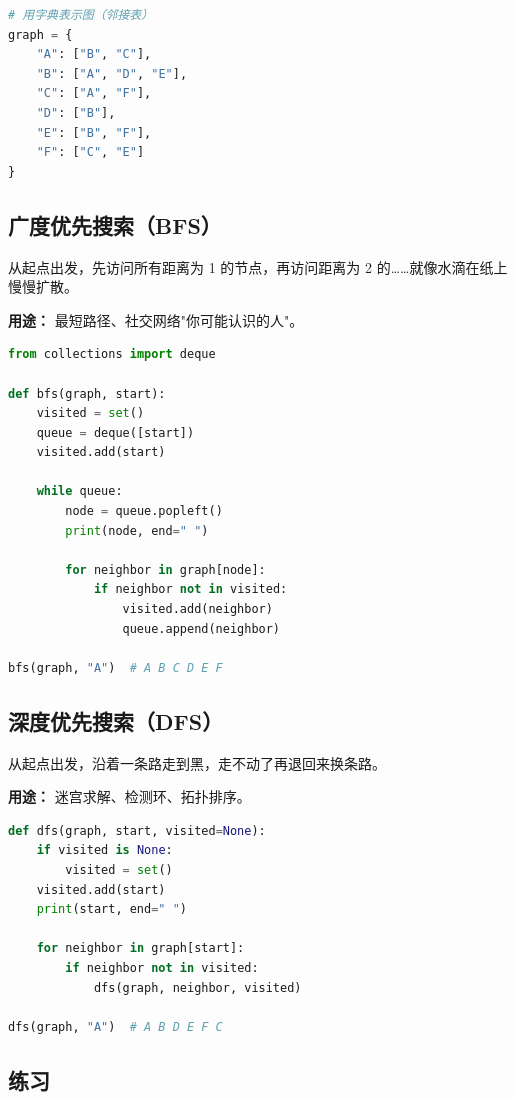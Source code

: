 \documentclass[a4paper,12pt]{ctexart}
\begin{document}
\begin{lstlisting}[language=Python]
# 用字典表示图（邻接表）
graph = {
    "A": ["B", "C"],
    "B": ["A", "D", "E"],
    "C": ["A", "F"],
    "D": ["B"],
    "E": ["B", "F"],
    "F": ["C", "E"]
}
\end{lstlisting}

\subsection*{广度优先搜索（BFS）}

从起点出发，先访问所有距离为 1 的节点，再访问距离为 2 的……就像水滴在纸上慢慢扩散。

\textbf{用途：} 最短路径、社交网络"你可能认识的人"。

\begin{lstlisting}[language=Python]
from collections import deque

def bfs(graph, start):
    visited = set()
    queue = deque([start])
    visited.add(start)
    
    while queue:
        node = queue.popleft()
        print(node, end=" ")
        
        for neighbor in graph[node]:
            if neighbor not in visited:
                visited.add(neighbor)
                queue.append(neighbor)

bfs(graph, "A")  # A B C D E F
\end{lstlisting}

\subsection*{深度优先搜索（DFS）}

从起点出发，沿着一条路走到黑，走不动了再退回来换条路。

\textbf{用途：} 迷宫求解、检测环、拓扑排序。

\begin{lstlisting}[language=Python]
def dfs(graph, start, visited=None):
    if visited is None:
        visited = set()
    visited.add(start)
    print(start, end=" ")
    
    for neighbor in graph[start]:
        if neighbor not in visited:
            dfs(graph, neighbor, visited)

dfs(graph, "A")  # A B D E F C
\end{lstlisting}

\subsection*{练习}
\end{document}
